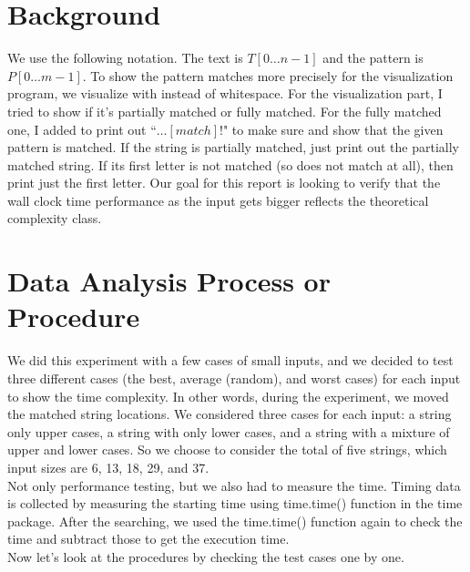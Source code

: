 \documentclass{article}
\begin{document}
\section{\textbf{Background}}
\indent We use the following notation. The text is $T[0 \ldots n-1]$ and the pattern is $P[0 \ldots m-1]$. To show the pattern matches more precisely for the visualization program, we visualize with \textunderscore instead of whitespace. For the visualization part, I tried to show if it's partially matched or fully matched. For the fully matched one, I added to print out ``$\ldots [match]!$" to make sure and show that the given pattern is matched. If the string is partially matched, just print out the partially matched string. If its first letter is not matched (so does not match at all), then print just the first letter. Our goal for this report is looking to verify that the wall clock time performance as the input gets bigger reflects the theoretical complexity class.

\section{\textbf{Data Analysis Process or Procedure}}
\indent We did this experiment with a few cases of small inputs, and we decided to test three different cases (the best, average (random), and worst cases) for each input to show the time complexity. In other words, during the experiment, we moved the matched string locations. We considered three cases for each input: a string only upper cases, a string with only lower cases, and a string with a mixture of upper and lower cases. So we choose to consider the total of five strings, which input sizes are 6, 13, 18, 29, and 37. \\
\indent Not only performance testing, but we also had to measure the time. Timing data is collected by measuring the starting time using time.time() function in the time package. After the searching, we used the time.time() function again to check the time and subtract those to get the execution time. \\
\indent Now let's look at the procedures by checking the test cases one by one.
\end{document}
